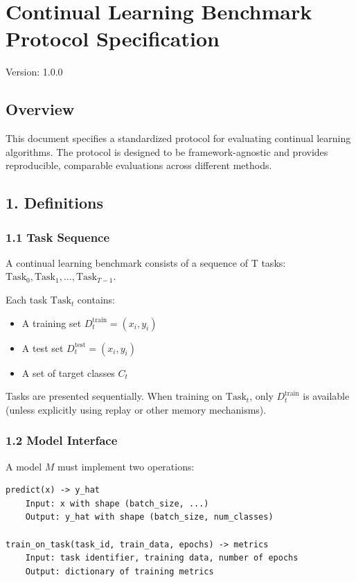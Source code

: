 \documentclass[11pt]{article}
\begin{document}
\section{Continual Learning Benchmark Protocol Specification}

Version: 1.0.0

\subsection{Overview}

This document specifies a standardized protocol for evaluating continual learning algorithms. The protocol is designed to be framework-agnostic and provides reproducible, comparable evaluations across different methods.

\subsection{1. Definitions}

\subsubsection{1.1 Task Sequence}

A continual learning benchmark consists of a sequence of T tasks: ${\mathrm{Task}_0, \mathrm{Task}_1, \ldots, \mathrm{Task}_{T-1}}$.

Each task $\mathrm{Task}_t$ contains:

\begin{itemize}[leftmargin=*]
\item A training set $D_t^{\mathrm{train}} = {(x_i, y_i)}$
\item A test set $D_t^{\mathrm{test}} = {(x_i, y_i)}$
\item A set of target classes $C_t$
\end{itemize}

Tasks are presented sequentially. When training on $\mathrm{Task}_t$, only $D_t^{\mathrm{train}}$ is available (unless explicitly using replay or other memory mechanisms).

\subsubsection{1.2 Model Interface}

A model $M$ must implement two operations:

\begin{Verbatim}[fontsize=\small]
predict(x) -> y_hat
    Input: x with shape (batch_size, ...)
    Output: y_hat with shape (batch_size, num_classes)

train_on_task(task_id, train_data, epochs) -> metrics
    Input: task identifier, training data, number of epochs
    Output: dictionary of training metrics
\end{Verbatim}
\end{document}
